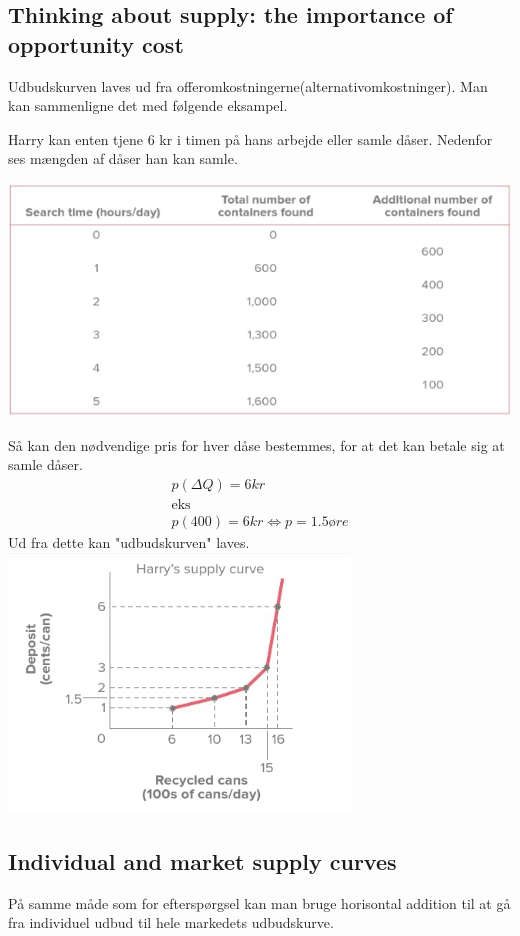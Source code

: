 \subsection{Thinking about supply: the importance of opportunity cost}
Udbudskurven laves ud fra offeromkostningerne(alternativomkostninger). Man kan sammenligne det med følgende eksampel.
\begin{eks} \textbf{} %
\newline
Harry kan enten tjene 6 kr i timen på hans arbejde eller samle dåser. Nedenfor ses mængden af dåser han kan samle.

\includegraphics[scale=0.8]{Afsnit/Lektion2/Harry.png} 

Så kan den nødvendige pris for hver dåse bestemmes, for at det kan betale sig at samle dåser.
\begin{align*}
    p(\Delta Q) = 6kr\\
    \text{eks}\\
    p(400) = 6kr \Leftrightarrow p = 1.5 øre
\end{align*}
Ud fra dette kan "udbudskurven" laves.
\includegraphics[scale=0.8]{Afsnit/Lektion2/Harry2.png}
\end{eks}

\subsection{Individual and market supply curves}
På samme måde som for efterspørgsel kan man bruge horisontal addition til at gå fra individuel udbud til hele markedets udbudskurve. 

